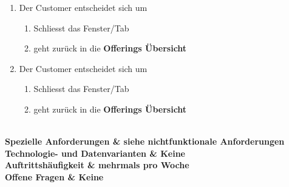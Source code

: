 \documentclass[11pt]{scrartcl}
\begin{document}
\begin{longtabu}
\begin{enumerate}
\begin{enumerate}
		       \item  Der Customer entscheidet sich um
		     \begin{enumerate}
		      \item Schliesst das Fenster/Tab
		      \item geht zurück in die \textbf{Offerings Übersicht}
		    \end{enumerate}
		    
		    
		     \item  Der Customer entscheidet sich um
		     \begin{enumerate}
		      \item Schliesst das Fenster/Tab
		      \item geht zurück in die \textbf{Offerings Übersicht}
		    \end{enumerate}
		    
		  \end{enumerate}
			
		\end{enumerate}
	 \\\hline
	\bfseries Spezielle Anforderungen & siehe nichtfunktionale Anforderungen  \\\hline 
	\bfseries Technologie- und Datenvarianten & Keine  \\\hline 
	\bfseries Auftrittshäufigkeit & mehrmals pro Woche  \\\hline 
	\bfseries Offene Fragen & Keine  \\\hline  
\end{longtabu}
\newpage
\end{document}
